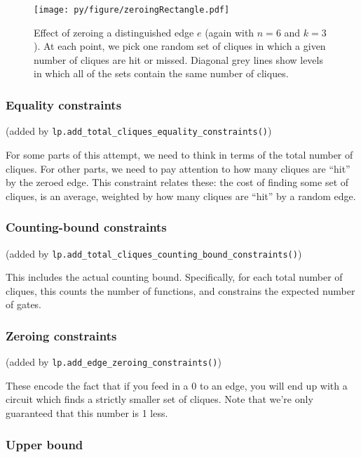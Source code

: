 \documentclass[12pt]{article}
\theoremstyle{definition}
\begin{document}
\begin{figure}
\centering
\texttt{[image: py/figure/zeroingRectangle.pdf]}
\caption{Effect of zeroing a distinguished edge $e$
(again with $n=6$ and $k=3$).
At each point, we pick one random set of cliques in which
a given number of cliques are hit or missed.
Diagonal grey lines show levels in which all of the sets
contain the same number of cliques.
}
\label{fig:zeroingRectangle}
\end{figure}

\subsubsection{Equality constraints}

(added by {\tt lp.add\_total\_cliques\_equality\_constraints()})

For some parts of this attempt, we need to think in terms of
the total number of cliques. For other parts, we need to pay attention
to how many cliques are ``hit'' by the zeroed edge. This constraint
relates these: the cost of finding some set of cliques, is an
average, weighted by how many cliques are ``hit'' by a random edge.

\subsubsection{Counting-bound constraints}

(added by {\tt lp.add\_total\_cliques\_counting\_bound\_constraints()})

This includes the actual counting bound. Specifically, for
each total number of cliques, this counts the number of functions,
and constrains the expected number of gates.

\subsubsection{Zeroing constraints}

(added by {\tt lp.add\_edge\_zeroing\_constraints()})

These encode the fact that if you feed in a 0 to an edge,
you will end up with a circuit which finds a strictly smaller
set of cliques. Note that we're only guaranteed that this
number is 1 less.

\subsubsection{Upper bound}
\end{document}
